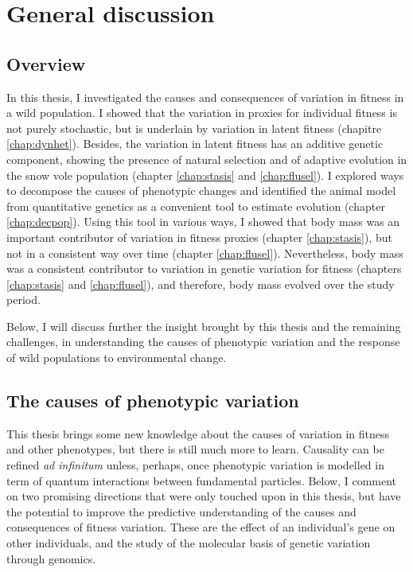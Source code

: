 
\chapter[\texorpdfstring{Chapter 6 \\ General discussion}{Chapter 6 General discussion}]{General discussion}
\label{chap:discu}

\section{Overview}
In this thesis, I investigated the causes and consequences of variation in fitness in a wild population. I showed that the variation in proxies for individual fitness is not purely stochastic, but is underlain by variation in latent fitness (chapitre \ref{chap:dynhet}). Besides, the variation in latent fitness has an additive genetic component, showing the presence of natural selection and of adaptive evolution in the snow vole population (chapter \ref{chap:stasis} and \ref{chap:flusel}).
I explored ways to decompose the causes of phenotypic changes and identified the animal model from quantitative genetics as a convenient tool to estimate evolution (chapter \ref{chap:decpop}).
Using this tool in various ways, I showed that body mass was an important contributor of variation in fitness proxies (chapter \ref{chap:stasis}), but not in a consistent way over time (chapter \ref{chap:flusel}). Nevertheless, body mass was a consistent contributor to variation in genetic variation for fitness (chapters \ref{chap:stasis} and \ref{chap:flusel}), and therefore, body mass evolved over the study period.

Below, I will discuss further the insight brought by this thesis and the remaining challenges, in understanding the causes of phenotypic variation and the response of wild populations to environmental change. 

\section{The causes of phenotypic variation}
This thesis brings some new knowledge about the causes of variation in fitness and other phenotypes, but there is still much more to learn. Causality can be refined \emph{ad infinitum} unless, perhaps, once phenotypic variation is modelled in term of quantum interactions between fundamental particles. Below, I comment on two promising directions that were only touched upon in this thesis, but have the potential to improve the predictive understanding of the causes and consequences of fitness variation. These are the effect of an individual's gene on other individuals, and the study of the molecular basis of genetic variation through genomics.

